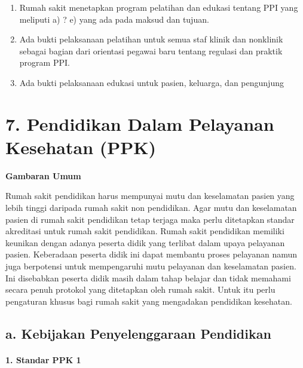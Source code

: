 \documentclass[
]{book}
\providecommand{\tightlist}{%
  \setlength{\itemsep}{0pt}\setlength{\parskip}{0pt}}
\begin{document}
\begin{enumerate}
\def\labelenumi{\alph{enumi}.}
\tightlist
\item
  Rumah sakit menetapkan program pelatihan dan edukasi tentang PPI yang meliputi a) ? e) yang ada pada maksud dan tujuan.
\item
  Ada bukti pelaksanaan pelatihan untuk semua staf klinik dan nonklinik sebagai bagian dari orientasi pegawai baru tentang regulasi dan praktik program PPI.
\item
  Ada bukti pelaksanaan edukasi untuk pasien, keluarga, dan pengunjung
\end{enumerate}

\hypertarget{pendidikan-dalam-pelayanan-kesehatan-ppk}{%
\section*{7. Pendidikan Dalam Pelayanan Kesehatan (PPK)}\label{pendidikan-dalam-pelayanan-kesehatan-ppk}}

\textbf{Gambaran Umum}

Rumah sakit pendidikan harus mempunyai mutu dan keselamatan pasien yang lebih tinggi daripada rumah sakit non pendidikan. Agar mutu dan keselamatan pasien di rumah sakit pendidikan tetap terjaga maka perlu ditetapkan standar akreditasi untuk rumah sakit pendidikan. Rumah sakit pendidikan memiliki keunikan dengan adanya peserta didik yang terlibat dalam upaya pelayanan pasien. Keberadaan peserta didik ini dapat membantu proses pelayanan namun juga berpotensi untuk mempengaruhi mutu pelayanan dan keselamatan pasien. Ini disebabkan peserta didik masih dalam tahap belajar dan tidak memahami secara penuh protokol yang ditetapkan oleh rumah sakit. Untuk itu perlu pengaturan khusus bagi rumah sakit yang mengadakan pendidikan kesehatan.

\hypertarget{a.-kebijakan-penyelenggaraan-pendidikan}{%
\subsection*{a. Kebijakan Penyelenggaraan Pendidikan}\label{a.-kebijakan-penyelenggaraan-pendidikan}}

\hypertarget{standar-ppk-1}{%
\paragraph*{1. Standar PPK 1}\label{standar-ppk-1}}
\end{document}
